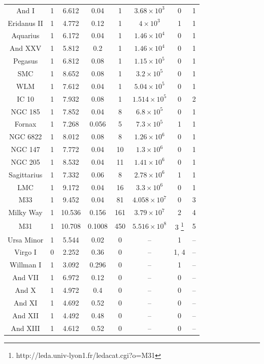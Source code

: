 \documentclass[twocolumn]{aastex631}
\begin{document}
\begin{longtable}{cccccccc}
And I & 1 & 6.612 &  0.04 & 1 & $3.68 \times 10^3$ & 0 & 1 \\
Eridanus II & 1 & 4.772 &  0.12 & 1 & $4 \times 10^3$ & 1 & 1 \\
Aquarius & 1 & 6.172 & 0.04 & 1 & $1.46 \times 10^4$ & 0 & 1 \\
And XXV & 1 & 5.812 & 0.2 & 1 & $1.46 \times 10^4$ & 0 & 1 \\
Pegasus & 1 & 6.812 & 0.08 & 1 & $1.15 \times 10^5$ & 0 & 1 \\
SMC & 1 & 8.652 & 0.08 & 1 & $3.2 \times 10^5$ & 0 & 1 \\ 
WLM & 1 & 7.612 & 0.04 & 1 & $5.04 \times 10^5$ & 0 & 1 \\
IC 10 & 1 & 7.932 & 0.08 & 1 & $1.514 \times 10^5$ & 0 & 2 \\ 
NGC 185 & 1 & 7.852 & 0.04 & 8 & $6.8 \times 10^5$ & 0 & 1 \\
Fornax & 1 & 7.268 & 0.056 & 5 & $7.3 \times 10^5$ & 1 & 1 \\
NGC 6822 & 1 & 8.012 & 0.08 & 8 & $1.26 \times 10^6$ & 0 & 1 \\
NGC 147 & 1 & 7.772 & 0.04 & 10 & $1.3 \times 10^6$ & 0 & 1 \\
NGC 205 & 1 & 8.532 & 0.04 & 11 & $1.41 \times 10^6$ & 0 & 1 \\
Sagittarius & 1 & 7.332 & 0.06 & 8 & $2.78 \times 10^6$ & 1 & 1 \\ 
LMC & 1 & 9.172 & 0.04 & 16 & $3.3 \times 10^6$ & 0 & 1 \\ 
M33 & 1 & 9.452 & 0.04 & 81 & $4.058 \times 10^7$ & 0 & 3 \\
Milky Way & 1 & 10.536 & 0.156 & 161 & $3.79 \times 10^7$ & 2 & 4 \\
M31 & 1 & 10.708 & 0.1008 & 450 & $5.516 \times 10^8$ & 3 \footnote{http://leda.univ-lyon1.fr/ledacat.cgi?o=M31} & 5 \\ 
Ursa Minor & 1 & 5.544 & 0.02 & 0 & -- & 1 & -- \\
Virgo I & 0 & 2.252 & 0.36 & 0 & -- & 1, 4 & -- \\ %
Willman I & 1 & 3.092 & 0.296 & 0 & -- & 1 & -- \\
And VII & 1 & 6.972 & 0.12 & 0 & -- & 0 & -- \\
And X & 1 & 4.972 & 0.4 & 0 & -- & 0 & -- \\ 
And XI & 1 & 4.692 & 0.52 & 0 & -- & 0 & -- \\
And XII & 1 & 4.492 & 0.48 & 0 & -- & 0 & -- \\
And XIII & 1 & 4.612 & 0.52 & 0 & -- & 0 & -- \\

\end{longtable}
\end{document}
